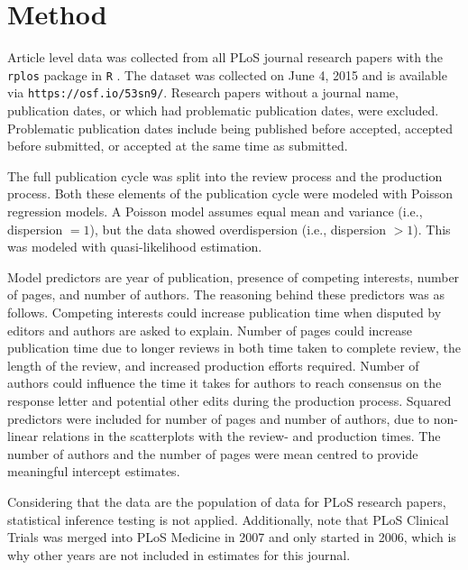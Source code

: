 \section*{Method}
Article level data was collected from all PLoS journal research papers with the \texttt{rplos} package \cite[v0.4.7][]{rplos} in \texttt{R} \cite[v3.2.0][]{rcran}. The dataset was collected on June 4, 2015 and is available via \texttt{https://osf.io/53sn9/}. Research papers without a journal name, publication dates, or which had problematic publication dates, were excluded. Problematic publication dates include being published before accepted, accepted before submitted, or accepted at the same time as submitted.

The full publication cycle was split into the review process and the production process. Both these elements of the publication cycle were modeled with Poisson regression models. A Poisson model assumes equal mean and variance (i.e., dispersion $=1$), but the data showed overdispersion (i.e., dispersion $>1$). This was modeled with quasi-likelihood estimation.

Model predictors are year of publication, presence of competing interests, number of pages, and number of authors. The reasoning behind these predictors was as follows. Competing interests could increase publication time when disputed by editors and authors are asked to explain. Number of pages could increase publication time due to longer reviews in both time taken to complete review, the length of the review, and increased production efforts required. Number of authors could influence the time it takes for authors to reach consensus on the response letter and potential other edits during the production process. Squared predictors were included for number of pages and number of authors, due to non-linear relations in the scatterplots with the review- and production times. The number of authors and the number of pages were mean centred to provide meaningful intercept estimates.

Considering that the data are the population of data for PLoS research papers, statistical inference testing is not applied. Additionally, note that PLoS Clinical Trials was merged into PLoS Medicine in 2007 and only started in 2006, which is why other years are not included in estimates for this journal.